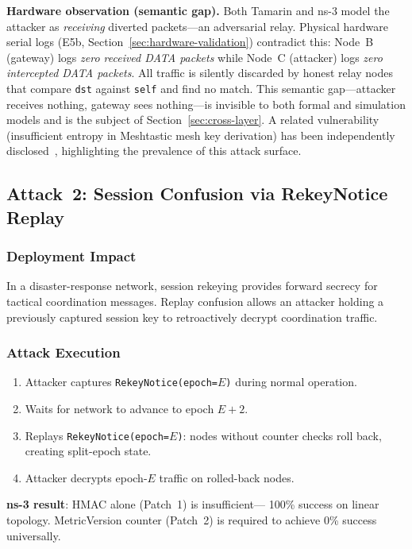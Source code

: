 \documentclass[preprint,12pt]{elsarticle}
\begin{document}
\textbf{Hardware observation (semantic gap).}
Both Tamarin and ns-3 model the attacker as \emph{receiving} diverted
packets—an adversarial relay.
Physical hardware serial logs (E5b, Section~\ref{sec:hardware-validation})
contradict this: Node~B (gateway) logs \emph{zero received DATA packets}
while Node~C (attacker) logs \emph{zero intercepted DATA packets}.
All traffic is silently discarded by honest relay nodes that compare
\texttt{dst} against \texttt{self} and find no match.
This semantic gap—attacker receives nothing, gateway sees nothing—is
invisible to both formal and simulation models and is the subject of
Section~\ref{sec:cross-layer}.
A related vulnerability (insufficient entropy in Meshtastic mesh
key derivation) has been independently disclosed~\cite{cve2025-meshtastic-entropy},
highlighting the prevalence of this attack surface.

\subsection{Attack~2: Session Confusion via RekeyNotice Replay}

\subsubsection{Deployment Impact}
In a disaster-response network, session rekeying provides forward
secrecy for tactical coordination messages. Replay confusion
allows an attacker holding a previously captured session key to
retroactively decrypt coordination traffic.

\subsubsection{Attack Execution}
\begin{enumerate}
  \item Attacker captures \texttt{RekeyNotice(epoch=$E$)} during
    normal operation.
  \item Waits for network to advance to epoch $E{+}2$.
  \item Replays \texttt{RekeyNotice(epoch=$E$)}: nodes without
    counter checks roll back, creating split-epoch state.
  \item Attacker decrypts epoch-$E$ traffic on rolled-back nodes.
\end{enumerate}

\textbf{ns-3 result}: HMAC alone (Patch~1) is insufficient—
100\% success on linear topology. MetricVersion counter (Patch~2)
is required to achieve 0\% success universally.
\end{document}
